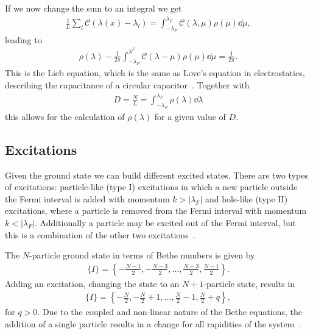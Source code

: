 \documentclass[11pt, a4paper]{report} %
\begin{document}
If we now change the sum to an integral we get 
\begin{align}
  \frac{1}{L} \sum_l \mathcal{C}(\lambda(x)- \lambda_l) = \int_{-\lambda_F}^{\lambda_F} \mathcal{C}(\lambda,\mu) \rho(\mu) \dd \mu, 
\end{align}
leading to~\cite{Korepin1993}
\begin{align}
  \rho(\lambda) - \frac{1}{2\pi} \int_{-\lambda_F}^{\lambda^F} \mathcal{C}(\lambda-\mu) \rho(\mu) \dd \mu = \frac{1}{2\pi}.
\end{align}
This is the Lieb equation, which is the same as Love's equation in electrostatics, describing the capacitance of a circular capacitor~\cite{Gaudin2009}.
Together with 
\begin{align}
  D = \frac{N}{L} = \int_{-\lambda_F}^{\lambda_F} \rho(\lambda) \dd \lambda
\end{align}
this allows for the calculation of \(\rho(\lambda)\) for a given value of \(D\).


\subsection{Excitations}

Given the ground state we can build different excited states.
There are two types of excitations: particle-like (type I) excitations in which a new particle outside the Fermi interval is added with momentum \(k > \left|\lambda_F\right|\) and hole-like (type II) excitations, where a particle is removed from the Fermi interval with momentum \(k < \left|\lambda_F\right|\).
Additionally a particle may be excited out of the Fermi interval, but this is a combination of the other two excitations~\cite{Franchini2017}.

The \(N\)-particle ground state in terms of Bethe numbers is given by
\begin{align}
  \label{eq:22}
  \{I\} = \left\{-\frac{N-1}{2},-\frac{N-3}{2}, \ldots, \frac{N-3}{2},\frac{N-1}{2}\right\}.
\end{align}
Adding an excitation, changing the state to an \(N+1\)-particle state, results in
\begin{align}
  \label{eq:23}
    \{I\} = \left\{-\frac{N}{2},-\frac{N}{2}+1, \ldots, \frac{N}{2}-1,\frac{N}{2}+q\right\},
\end{align}
for \(q>0\).
Due to the coupled and non-linear nature of the Bethe equations, the addition of a single particle results in a change for all rapidities of the system~\cite{Franchini2017}.
\end{document}
